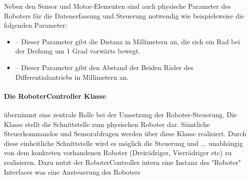 Neben den Sensor und Motor-Elementen sind auch physische Parameter des Roboters für die Datenerfassung und Steuerung notwendig wie
beispielsweise die folgenden Parameter:
\begin{itemize}
	\item{} -- Dieser Parameter gibt die Distanz in Millimetern 
	an, die sich ein Rad bei der Drehung um 1 Grad vorwärts bewegt.  
	\item{} -- Dieser Parameter gibt den Abstand der Beiden Räder 
	des Differentialantriebs in Millimetern an.
\end{itemize}

\paragraph{Die RoboterController Klasse} übernimmt eine zentrale Rolle bei der Umsetzung der Roboter-Steuerung. Die Klasse stellt die 
Schnittstelle zum physischen Roboter dar. Sämtliche Steuerkommandos und Sensorabfragen werden über diese Klasse realisiert. Durch diese einheitliche 
Schnittstelle wird es möglich die Steuerung und ... unabhängig von dem konkreten vorhandenen Roboter (Dreirädriger, Vierrädriger etc)
zu realisieren. Dazu nutzt der RoboterController intern eine Instanz des "Roboter" Interfaces was eine Ansteuerung des Roboters 
\\
